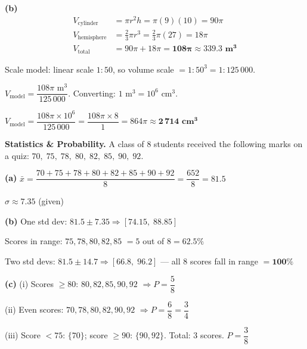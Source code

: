 \documentclass[addpoints]{exam}
\begin{document}
\begin{questions}
\begin{solution}[10cm]
\textbf{(b)}
\begin{align*}
V_{\text{cylinder}} &= \pi r^2 h = \pi(9)(10) = 90\pi\\
V_{\text{hemisphere}} &= \tfrac{2}{3}\pi r^3 = \tfrac{2}{3}\pi(27) = 18\pi\\
V_{\text{total}} &= 90\pi + 18\pi = \mathbf{108\pi \approx 339.3 \text{ m}^3}
\end{align*}

Scale model: linear scale $1:50$, so volume scale $= 1:50^3 = 1:125\,000$.

$V_{\text{model}} = \dfrac{108\pi \text{ m}^3}{125\,000}$. Converting: $1 \text{ m}^3 = 10^6 \text{ cm}^3$.

$V_{\text{model}} = \dfrac{108\pi \times 10^6}{125\,000} = \dfrac{108\pi \times 8}{1} = 864\pi \approx \mathbf{2\,714 \text{ cm}^3}$
\end{solution}

\question[8] \textbf{Statistics \& Probability.}
A class of 8 students received the following marks on a quiz: $70,\; 75,\; 78,\; 80,\; 82,\; 85,\; 90,\; 92$.
\begin{solution}[10cm]
\textbf{(a)} $\bar{x} = \dfrac{70+75+78+80+82+85+90+92}{8} = \dfrac{652}{8} = \mathbf{81.5}$

$\sigma \approx \mathbf{7.35}$ (given)

\textbf{(b)} One std dev: $81.5 \pm 7.35 \Rightarrow [74.15,\; 88.85]$

Scores in range: $75, 78, 80, 82, 85$ $= 5$ out of $8 = \mathbf{62.5\%}$

Two std devs: $81.5 \pm 14.7 \Rightarrow [66.8,\; 96.2]$ — all 8 scores fall in range $= \mathbf{100\%}$

\textbf{(c)}
(i) Scores $\geq 80$: $80, 82, 85, 90, 92$ $\Rightarrow P = \dfrac{5}{8}$

(ii) Even scores: $70, 78, 80, 82, 90, 92$ $\Rightarrow P = \dfrac{6}{8} = \dfrac{3}{4}$

(iii) Score $< 75$: $\{70\}$; score $\geq 90$: $\{90, 92\}$. Total: 3 scores.
$P = \dfrac{3}{8}$
\end{solution}

\end{questions}
\end{document}
